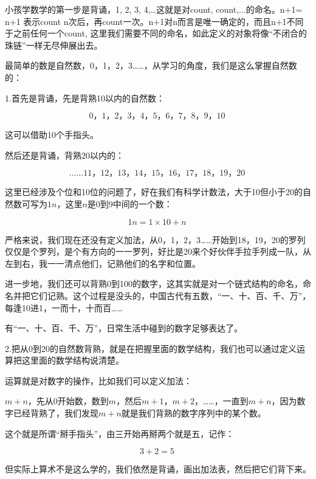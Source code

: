 小孩学数学的第一步是背诵，1, 2, 3, 4,…这就是对count, count,...的命名。n+1= n+1 表示count n次后，再count一次。n+1对n而言是唯一确定的，而且n+1不同于之前任何一个count, 这里我们需要不同的命名，如此定义的对象将像“不闭合的珠链”一样无尽伸展出去。

最简单的数是自然数，0，1，2，3……，从学习的角度，我们是这么掌握自然数的：

1.首先是背诵，先是背熟10以内的自然数：

\begin{equation}
\text{0，1，2，3，4，5，6，7，8，9，10}~
\end{equation}

这可以借助10个手指头。

然后还是背诵，背熟20以内的：

\begin{equation}
\text{……11，12，13，14，15，16，17，18，19，20}~
\end{equation}

这里已经涉及个位和10位的问题了，好在我们有科学计数法，大于10但小于20的自然数可写为$1n$，这里$n$是0到9中间的一个数：

\begin{equation}
1n  = 1 \times 10 + n~
\end{equation}

严格来说，我们现在还没有定义加法，从0，1，2，3……开始到18，19，20的罗列仅仅是个罗列，是个有方向的一一罗列，好比是20来个好伙伴手拉手列成一队，从左到右，我一一清点他们，记熟他们的名字和位置。

进一步地，我们还可以背熟0到100的数字，这其实就是对一个链式结构的命名，命名并把它们记熟。这个过程是没头的，中国古代有五数，“一、十、百、千、万”，每逢10进1，一而十，十而百……

有“一、十、百、千、万”，日常生活中碰到的数字足够表达了。

2.把从0到20的自然数背熟，就是在把握里面的数学结构，我们也可以通过定义运算把这里面的数学结构说清楚。

运算就是对数字的操作，比如我们可以定义加法：

$m + n$，先从0开始数，数到$m$，然后$m+1$，$m+2$，……，一直到$m+n$，因为数字已经背熟了，我们发现$m+n$就是我们背熟的数字序列中的某个数。

这个就是所谓“掰手指头”，由三开始再掰两个就是五，记作：

\begin{equation}
3+2 = 5~
\end{equation}

但实际上算术不是这么学的，我们依然是背诵，画出加法表，然后把它们背下来。

